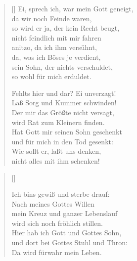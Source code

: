 \begin{multicols}{2}
\begin{verse}[\versewidth]
 Ei, sprech ich, war mein Gott geneigt,\\
da wir noch Feinde waren,\\
so wird er ja, der kein Recht beugt,\\
nicht feindlich mit mir fahren\\
anitzo, da ich ihm versühnt,\\
da, was ich Böses je verdient,\\
sein Sohn, der nichts verschuldet,\\
so wohl für mich erduldet.

 Fehlts hier und dar? Ei unverzagt!\\
Laß Sorg und Kummer schwinden!\\
Der mir das Größte nicht versagt,\\
wird Rat zum Kleinern finden.\\
Hat Gott mir seinen Sohn geschenkt\\
und für mich in den Tod gesenkt:\\
Wie sollt er, laßt uns denken,\\
nicht alles mit ihm schenken!


\end{verse}
\end{multicols}

\begin{center}
\settowidth{\versewidth}{Ich bins gewiß und sterbe drauf:}
\begin{verse}[\versewidth]

 Ich bins gewiß und sterbe drauf:\\
Nach meines Gottes Willen\\
mein Kreuz und ganzer Lebenslauf\\
wird sich noch fröhlich stillen.\\
Hier hab ich Gott und Gottes Sohn,\\
und dort bei Gottes Stuhl und Thron:\\
Da wird fürwahr mein Leben.
  
\end{verse}
\end{center}

